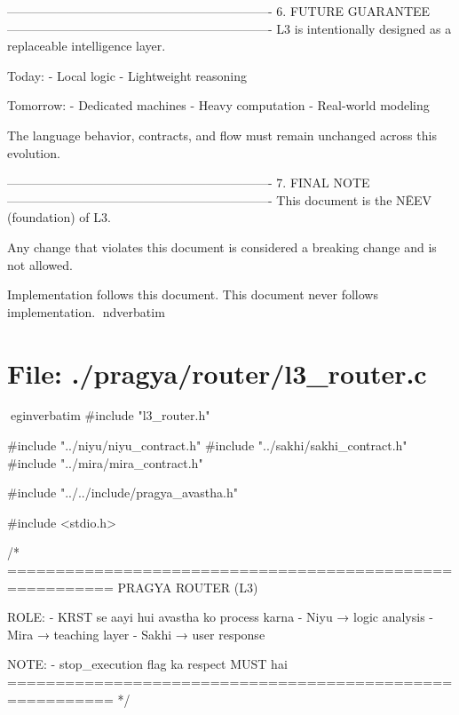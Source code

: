 \documentclass{article}
\begin{document}
----------------------------------------------------------------
6. FUTURE GUARANTEE
----------------------------------------------------------------
L3 is intentionally designed as a replaceable intelligence layer.

Today:
- Local logic
- Lightweight reasoning

Tomorrow:
- Dedicated machines
- Heavy computation
- Real-world modeling

The language behavior, contracts, and flow
must remain unchanged across this evolution.

----------------------------------------------------------------
7. FINAL NOTE
----------------------------------------------------------------
This document is the NĒEV (foundation) of L3.

Any change that violates this document
is considered a breaking change and is not allowed.

Implementation follows this document.
This document never follows implementation.
nd{verbatim}
\section*{File: ./pragya/router/l3_router.c}
egin{verbatim}
#include "l3_router.h"

#include "../niyu/niyu_contract.h"
#include "../sakhi/sakhi_contract.h"
#include "../mira/mira_contract.h"

#include "../../include/pragya_avastha.h"

#include <stdio.h>

/*
=========================================================
   PRAGYA ROUTER (L3)

   ROLE:
   - KRST se aayi hui avastha ko process karna
   - Niyu → logic analysis
   - Mira → teaching layer
   - Sakhi → user response

   NOTE:
   - stop_execution flag ka respect MUST hai
=========================================================
*/
\end{document}
